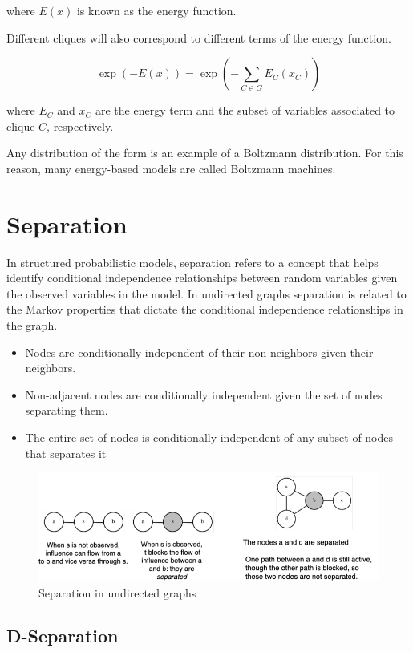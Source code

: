where $E(x)$ is known as the energy function. 

\noindent Different cliques will also correspond to different terms of the energy function.

$$ \exp{(-E(x))} = \exp{\left(-\sum_{C \in G} E_C(x_C)\right)} $$

where $E_C$ and $x_C$ are the energy term and the subset of variables associated to clique $C$, respectively.

\noindent Any distribution of the form is an example of a Boltzmann distribution. For this reason, many energy-based models are called Boltzmann machines.


\section{Separation}

In structured probabilistic models, separation refers to a concept that helps identify conditional independence relationships between random variables given the observed variables in the model. In undirected graphs separation is related to the Markov properties that dictate the conditional independence relationships in the graph.

\begin{itemize}
    \item Nodes are conditionally independent of their non-neighbors given their neighbors.
    \item Non-adjacent nodes are conditionally independent given the set of nodes separating them.
    \item The entire set of nodes is conditionally independent of any subset of nodes that separates it
\end{itemize}

\begin{figure}[h]
    \centering
    \includegraphics[width=13cm]{Images/separation.png}
    \caption{Separation in undirected graphs}
\end{figure}


\subsection{D-Separation}

